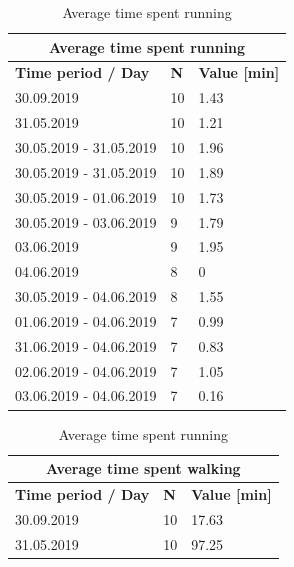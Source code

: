 \begin{table}[]
	\parbox{.45\linewidth}{
		\centering
		\begin{tabular}{|l|l|l|}
			\hline
			\multicolumn{3}{|c|}{\textbf{Average time spent running}}          \\ \hline
			\textbf{Time period / Day} & \textbf{N} & \textbf{Value {[}min{]}} \\ \hline
			30.09.2019                 & 10         & 1.43                     \\ \hline
			31.05.2019                 & 10         & 1.21                     \\ \hline
			30.05.2019 - 31.05.2019    & 10         & 1.96                     \\ \hline
			30.05.2019 - 31.05.2019    & 10         & 1.89                     \\ \hline
			30.05.2019 - 01.06.2019    & 10         & 1.73                     \\ \hline
			30.05.2019 - 03.06.2019    & 9          & 1.79                     \\ \hline
			03.06.2019                 & 9          & 1.95                     \\ \hline
			04.06.2019                 & 8          & 0                        \\ \hline
			30.05.2019 - 04.06.2019    & 8          & 1.55                     \\ \hline
			01.06.2019 - 04.06.2019    & 7          & 0.99                     \\ \hline
			31.06.2019 - 04.06.2019    & 7          & 0.83                     \\ \hline
			02.06.2019 - 04.06.2019    & 7          & 1.05                     \\ \hline
			03.06.2019 - 04.06.2019    & 7          & 0.16                     \\ \hline
		\end{tabular}
		\caption{Average time spent running}
		\label{results-running}
	}
	\hfill
	\parbox{.45\linewidth}{
		\centering
		\begin{tabular}{|l|l|l|}
			\hline
			\multicolumn{3}{|c|}{\textbf{Average time spent walking}}          \\ \hline
			\textbf{Time period / Day} & \textbf{N} & \textbf{Value {[}min{]}} \\ \hline
			30.09.2019                 & 10         & 17.63                    \\ \hline
			31.05.2019                 & 10         & 97.25                    \\ \hline

\end{tabular}}
\end{table}
